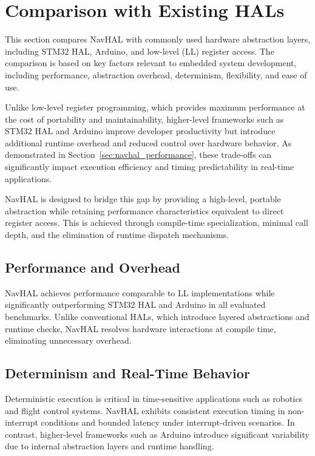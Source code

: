 \section{Comparison with Existing HALs}
\label{sec:navhal_comparison}

This section compares NavHAL with commonly used hardware abstraction layers, including STM32 HAL, Arduino, and low-level (LL) register access. The comparison is based on key factors relevant to embedded system development, including performance, abstraction overhead, determinism, flexibility, and ease of use.

Unlike low-level register programming, which provides maximum performance at the cost of portability and maintainability, higher-level frameworks such as STM32 HAL and Arduino improve developer productivity but introduce additional runtime overhead and reduced control over hardware behavior. As demonstrated in Section~\ref{sec:navhal_performance}, these trade-offs can significantly impact execution efficiency and timing predictability in real-time applications.

NavHAL is designed to bridge this gap by providing a high-level, portable abstraction while retaining performance characteristics equivalent to direct register access. This is achieved through compile-time specialization, minimal call depth, and the elimination of runtime dispatch mechanisms.

\subsection{Performance and Overhead}

NavHAL achieves performance comparable to LL implementations while significantly outperforming STM32 HAL and Arduino in all evaluated benchmarks. Unlike conventional HALs, which introduce layered abstractions and runtime checks, NavHAL resolves hardware interactions at compile time, eliminating unnecessary overhead.

\subsection{Determinism and Real-Time Behavior}

Deterministic execution is critical in time-sensitive applications such as robotics and flight control systems. NavHAL exhibits consistent execution timing in non-interrupt conditions and bounded latency under interrupt-driven scenarios. In contrast, higher-level frameworks such as Arduino introduce significant variability due to internal abstraction layers and runtime handling.

